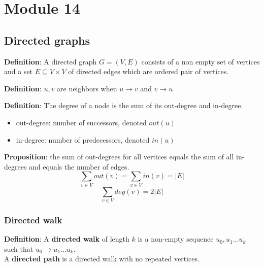 \chapter{Module 14}

\section{Directed graphs}

\begin{framed}
   \textbf{Definition}: A directed graph $G = (V, E)$ consists of a non empty set of vertices and a set $E \subseteq V \times V$ of directed edges which are ordered pair of vertices. 
\end{framed}

\begin{framed}
   \textbf{Definition}: $u, v$ are neighbors when $u \rightarrow v$ and $v \rightarrow u$ 
\end{framed}

\begin{framed}
   \textbf{Definition}: The degree of a node is the sum of its out-degree and in-degree.
   \begin{itemize}
      \item out-degree: number of successors, denoted $out(u)$
      \item in-degree: number of predecessors, denoted $in(u)$
   \end{itemize}
\end{framed}

\begin{framed}
   \textbf{Proposition}: the sum of out-degrees for all vertices equals the sum of all in-degrees and equals the number of edges. 
   \[
      \sum_{v \in V} out(v) = \sum_{v \in V} in(v) = |E|
   \] 
   \[
      \sum_{v \in V} deg(v) = 2 |E|
   \] 
\end{framed}

\subsection{Directed walk}
\begin{framed}
   \textbf{Definition}: A \textbf{directed walk} of length $k$ is a non-empty sequence $u_0, u_1 \hdots u_k$ such that $u_0 \rightarrow u_1 \hdots u_k$. \\

   A \textbf{directed path} is a directed walk with no repeated vertices. 
\end{framed}

